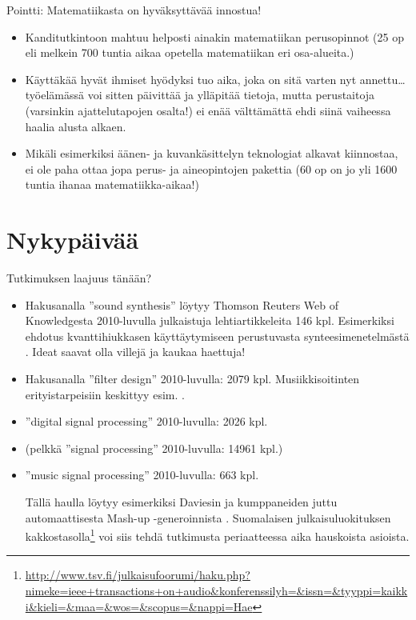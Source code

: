 \documentclass[pdf,9pt,handout]{beamer}
\begin{document}
\begin{frame}{Pointti: Matematiikasta on hyväksyttävää innostua!}

\begin{itemize}
\item
  Kanditutkintoon mahtuu helposti ainakin matematiikan perusopinnot
  (25 op eli melkein 700 tuntia aikaa opetella matematiikan eri
  osa-alueita.)
\item
  Käyttäkää hyvät ihmiset hyödyksi tuo aika, joka on sitä varten nyt
  annettu\ldots työelämässä voi sitten päivittää ja ylläpitää tietoja,
  mutta perustaitoja (varsinkin ajattelutapojen osalta!) ei enää
  välttämättä ehdi siinä vaiheessa haalia alusta alkaen.
\item
  Mikäli esimerkiksi äänen- ja kuvankäsittelyn teknologiat alkavat
  kiinnostaa, ei ole paha ottaa jopa perus- ja aineopintojen
  pakettia (60 op on jo yli 1600 tuntia ihanaa matematiikka-aikaa!)
\end{itemize}
\end{frame}




\section{Nykypäivää}

\begin{frame}{Tutkimuksen laajuus tänään?}
  \begin{itemize}
  \item
    Hakusanalla ''sound synthesis'' löytyy Thomson Reuters Web of
    Knowledgesta 2010-luvulla julkaistuja lehtiartikkeleita 146
    kpl. Esimerkiksi ehdotus kvanttihiukkasen käyttäytymiseen
    perustuvasta synteesimenetelmästä
    \cite{CadizRamos2014quantum}. Ideat saavat olla villejä ja kaukaa
    haettuja!
  \item
    Hakusanalla ''filter design'' 2010-luvulla: 2079
    kpl. Musiikkisoitinten erityistarpeisiin keskittyy
    esim. \cite{Wishnick14timevaryingfilters}.
  \item
    ''digital signal processing'' 2010-luvulla: 2026 kpl.
  \item
    (pelkkä ''signal processing'' 2010-luvulla: 14961 kpl.)
  \item
    ''music signal processing'' 2010-luvulla: 663 kpl.
    
    Tällä haulla löytyy esimerkiksi Daviesin ja kumppaneiden juttu
    automaattisesta Mash-up -generoinnista
    \cite{daviesEtal2014automashupper}. Suomalaisen
    julkaisuluokituksen
    kakkostasolla\footnote{{\tiny \url{http://www.tsv.fi/julkaisufoorumi/haku.php?nimeke=ieee+transactions+on+audio&konferenssilyh=&issn=&tyyppi=kaikki&kieli=&maa=&wos=&scopus=&nappi=Hae}}}
    voi siis tehdä tutkimusta periaatteessa aika hauskoista asioista.

  \end{itemize}
\end{frame}
\end{document}
